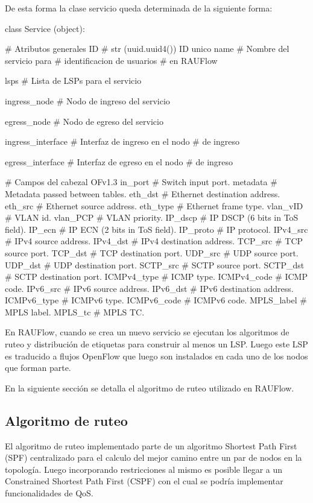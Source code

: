 De esta forma la clase servicio queda determinada de la siguiente forma:\\

\begin{python}
class Service (object):

		# Atributos generales
		ID 				    # str (uuid.uuid4()) ID unico  
		name 				# Nombre del servicio para 
							# identificacion de usuarios 
							# en RAUFlow
							
		lsps				# Lista de LSPs para el servicio
		
		ingress_node		# Nodo de ingreso del servicio
							
		egress_node 		# Nodo de egreso del servicio
							
		ingress_interface 	# Interfaz de ingreso en el nodo 
							# de ingreso
							
		egress_interface 	# Interfaz de egreso en el nodo 
							# de ingreso 
        
		# Campos del cabezal OFv1.3 
		in_port			# Switch input port. 
		metadata 		# Metadata passed between tables. 
		eth_dst 		# Ethernet destination address.
		eth_src 		# Ethernet source address. 
		eth_type 		# Ethernet frame type. 
		vlan_vID 		# VLAN id. 
		vlan_PCP		# VLAN priority. 
		IP_dscp 		# IP DSCP (6 bits in ToS field). 
		IP_ecn  		# IP ECN (2 bits in ToS field). 
		IP_proto		# IP protocol. 
		IPv4_src 		# IPv4 source address. 
		IPv4_dst 		# IPv4 destination address. 
		TCP_src 		# TCP source port. 
		TCP_dst 		# TCP destination port. 
		UDP_src 		# UDP source port. 
		UDP_dst 		# UDP destination port. 
		SCTP_src 		# SCTP source port. 
		SCTP_dst 		# SCTP destination port. 
		ICMPv4_type 	# ICMP type. 
		ICMPv4_code 	# ICMP code. 
		IPv6_src 		# IPv6 source address. 
		IPv6_dst 		# IPv6 destination address. 
		ICMPv6_type 	# ICMPv6 type. 
		ICMPv6_code 	# ICMPv6 code. 
		MPLS_label 		# MPLS label. 
		MPLS_tc 		# MPLS TC. 
		
\end{python}

En RAUFlow, cuando se crea un nuevo servicio se ejecutan los algoritmos de ruteo y distribución de etiquetas para construir al menos un LSP. Luego este LSP es traducido a flujos OpenFlow que luego son instalados en cada uno de los nodos que forman parte. 

En la siguiente secci\'on se detalla el algoritmo de ruteo utilizado en RAUFlow.

\subsection{Algoritmo de ruteo}
El algoritmo de ruteo implementado parte de un algoritmo Shortest Path First (SPF) centralizado para el calculo del mejor camino entre un par de nodos en la topolog\'ia. Luego incorporando restricciones al mismo es posible llegar a un Constrained Shortest Path First (CSPF) con el cual se podr\'ia implementar funcionalidades de QoS.\\

